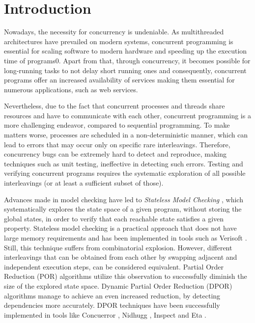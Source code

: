  \chapter{Introduction}

Nowadays, the necessity for concurrency is undeniable. 
As multithreaded architectures have prevailed on modern systems, concurrent 
programming is essential for scaling software to modern hardware and speeding up the execution time of programs0. Apart from that, through concurrency, it becomes possible for 
long-running tasks to not delay short running ones and consequently, concurrent programs offer an increased availability 
of services making them essential for numerous applications, such as web services. 

Nevertheless, due to the fact that concurrent processes and threads share resources and have to communicate with each other,
concurrent programming is a more challenging endeavor, compared to sequential programming. To make matters worse, 
processes are scheduled in a non-deterministic manner, which can lead to errors that may occur only on specific 
rare interleavings. Therefore, concurrency bugs can be extremely hard to detect and reproduce, making techniques such as
unit testing, ineffective in detecting such errors. Testing and verifying concurrent programs requires the systematic exploration
of all possible interleavings (or at least a sufficient subset of those).

Advances made in model checking have led to \textit{Stateless Model Checking} \cite{Godefroid:1997:MCP:263699.263717}, 
which systematically explores the state space of a given program, without storing the global states, in order to verify
that each reachable state satisfies a given property.
Stateless model checking is a practical approach that does not have large memory requirements and has been implemented in
tools such as Verisoft \cite{Godefroid:2005:SMC:1084665.1084674}.
Still, this technique suffers from combinatorial explosion. However, different interleavings that can be obtained from each other by
swapping adjacent and independent execution steps, can be considered equivalent.
Partial Order Reduction (POR) \cite{Godefroid1996, POR, 10.1007/3-540-53863-1_36} algorithms utilize this observation to successfully diminish
the size of the explored state space. Dynamic Partial Order Reduction 
(DPOR) \cite{FlanaganDPOR, AbdullaAronisJohnssonSagonasDPOR2014} algorithms manage to achieve an even increased reduction,
by detecting dependencies more accurately. DPOR techniques have been successfully implemented in tools like Concuerror 
\cite{6569727, Gotovos:2011:TDC:2034654.2034664}, Nidhugg \cite{Abdulla:2015:SMC:2945565.2945622}, Inspect \cite{Yang:2007:DDP:1770532.1770541}
and Eta \cite{simsa2011efficient}.

